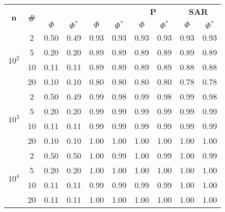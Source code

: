 \begin{table}
\begin{small}
		\bigskip
		\begin{tabular}{|c|c|cc|cc|cc|cc|}
			\hline
			\multirow{2}{*}{\textbf{n}} &
			\multirow{2}{*}{\textbf{\#}} &
			\multicolumn{2}{c|}{\textbf{\astar}} &
			\multicolumn{2}{c|}{\textbf{\ambush}} &
			\multicolumn{2}{c|}{\textbf{P}} &
			\multicolumn{2}{c|}{\textbf{SAR}}\\
			& & $\Phi$ & $\Phi^*$ & $\Phi$ & $\Phi^*$&
			$\Phi$ & $\Phi^*$& $\Phi$ & $\Phi^*$\\
			\hline
			\multirow{4}{*}{$10^2$}
			 & 2 & 0.50 & 0.49 & 0.93 & 0.93 & 0.93 & 0.93 & 0.93 & 0.93\\
			 & 5 & 0.20 & 0.20 & 0.89 & 0.89 & 0.89 & 0.89 & 0.89 & 0.89\\
			 & 10 & 0.11 & 0.11 & 0.89 & 0.89 & 0.89 & 0.89 & 0.88 & 0.88\\
			 & 20 & 0.10 & 0.10 & 0.80 & 0.80 & 0.80 & 0.80 & 0.78 & 0.78\\
			\hline
			\multirow{4}{*}{$10^3$}
			 & 2 & 0.50 & 0.49 & 0.99 & 0.98 & 0.99 & 0.98 & 0.99 & 0.98\\
			 & 5 & 0.20 & 0.20 & 0.99 & 0.99 & 0.99 & 0.99 & 0.99 & 0.99\\
			 & 10 & 0.11 & 0.11 & 0.99 & 0.99 & 0.99 & 0.99 & 0.99 & 0.99\\
			 & 20 & 0.10 & 0.10 & 1.00 & 1.00 & 1.00 & 1.00 & 1.00 & 1.00\\
			 \hline
			\multirow{4}{*}{$10^4$}
			 & 2 & 0.50 & 0.50 & 1.00 & 0.99 & 1.00 & 0.99 & 1.00 & 0.99\\
			 & 5 & 0.20 & 0.20 & 1.00 & 1.00 & 1.00 & 1.00 & 1.00 & 1.00\\
			 & 10 & 0.11 & 0.11 & 0.99 & 0.99 & 0.99 & 0.99 & 1.00 & 1.00\\
			 & 20 & 0.11 & 0.11 & 1.00 & 1.00 & 1.00 & 1.00 & 1.00 & 1.00\\
			 \hline
		\end{tabular}
	\end{small}
\end{table}
